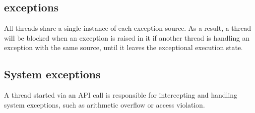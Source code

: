\subsection{\mt{} exceptions}

All threads share a single instance of each exception source. As a result,
a thread will be blocked when an exception is raised in it if another thread
is handling an exception with the same source, until it leaves the exceptional
execution state.

\subsection{System exceptions}

A thread started via an API call is responsible for intercepting and handling
system exceptions, such as arithmetic overflow or access violation.

